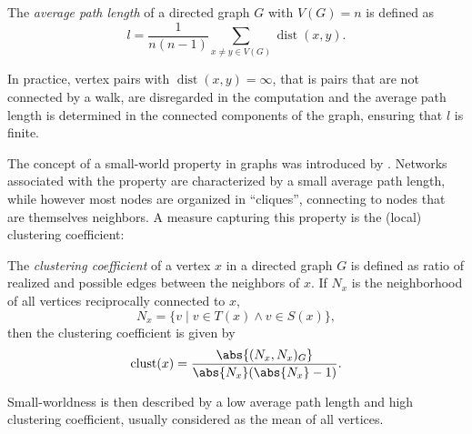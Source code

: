  \begin{definition} The \textit{average path
     length} of a directed graph $G$ with $V(G)=n$ is defined as
     \[
     l = \frac{1}{n(n-1)} \sum_{x\neq y \in V(G)}
     \operatorname{dist}(x,y). \]
\end{definition}

In practice, vertex pairs with $\operatorname{dist}(x,y) = \infty$, that is
pairs that are not connected by a walk, are disregarded in the
computation and the average path length is determined in the connected
components of the graph, ensuring that $l$ is finite.

The concept of a small-world property in graphs was introduced by
\textcite{Watts1998}. Networks associated with the property are
characterized by a small average path length, while however most nodes are
organized in \enquote{cliques}, connecting to nodes that are
themselves neighbors. A measure capturing this property is the (local)
clustering coefficient:

\begin{definition} The \textit{clustering
    coefficient} of a vertex $x$ in a directed graph $G$ is defined as
  ratio of realized and possible edges between the neighbors of
  $x$. If $N_x$ is the neighborhood of all vertices reciprocally
  connected to $x$,
  \[
    N_x = \{v \mid v \in T(x) \wedge v \in S(x)\},
  \] 
  then the clustering coefficient is given by
  \[
    \operatorname{clust}(x) = \frac{\abs{(N_x,N_x)_G}}{\abs{N_x}
      (\abs{N_x} -1)}.
  \]
\end{definition}

Small-worldness is then described by a low average path length and
high clustering coefficient, usually considered as the mean of all
vertices. 





